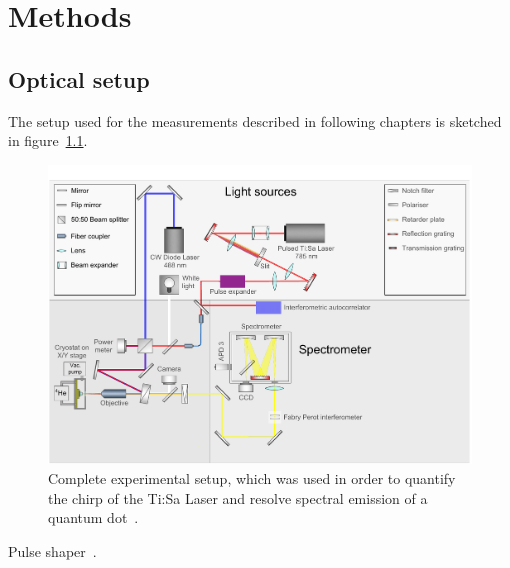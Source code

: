 \chapter{Methods}



\section{Optical setup}

The setup used for the measurements described in following chapters is sketched in figure~\ref{fig:setupflat}.

\begin{figure}[H]
	\centering
	\includegraphics[width=\linewidth]{figures/setup/Setup_flat}
	\caption[Complete experimental setup]{Complete experimental setup, which was used in order to quantify the chirp of the Ti:Sa Laser and resolve spectral emission of a quantum dot~\cite{schimpf_towards_2017}.}
	\label{fig:setupflat}
\end{figure}


Pulse shaper~\cite{sipek_spectral_2016}.

